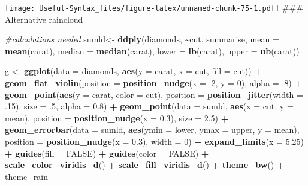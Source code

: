 \documentclass[
]{article}
\newenvironment{Shaded}{\begin{snugshade}}{\end{snugshade}}
\newcommand{\AttributeTok}[1]{\textcolor[rgb]{0.13,0.29,0.53}{#1}}
\newcommand{\CommentTok}[1]{\textcolor[rgb]{0.56,0.35,0.01}{\textit{#1}}}
\newcommand{\ConstantTok}[1]{\textcolor[rgb]{0.56,0.35,0.01}{#1}}
\newcommand{\DecValTok}[1]{\textcolor[rgb]{0.00,0.00,0.81}{#1}}
\newcommand{\FloatTok}[1]{\textcolor[rgb]{0.00,0.00,0.81}{#1}}
\newcommand{\FunctionTok}[1]{\textcolor[rgb]{0.13,0.29,0.53}{\textbf{#1}}}
\newcommand{\NormalTok}[1]{#1}
\newcommand{\OtherTok}[1]{\textcolor[rgb]{0.56,0.35,0.01}{#1}}
\newcommand{\SpecialCharTok}[1]{\textcolor[rgb]{0.81,0.36,0.00}{\textbf{#1}}}
\begin{document}
\texttt{[image: Useful-Syntax\_files/figure-latex/unnamed-chunk-75-1.pdf]}
\#\#\# Alternative raincloud

\begin{Shaded}
\begin{Highlighting}[]
\CommentTok{\#calculations needed}
\NormalTok{sumld}\OtherTok{\textless{}{-}} \FunctionTok{ddply}\NormalTok{(diamonds, }\SpecialCharTok{\textasciitilde{}}\NormalTok{cut, summarise, }\AttributeTok{mean =} \FunctionTok{mean}\NormalTok{(carat), }\AttributeTok{median =} \FunctionTok{median}\NormalTok{(carat), }\AttributeTok{lower =} \FunctionTok{lb}\NormalTok{(carat), }\AttributeTok{upper =} \FunctionTok{ub}\NormalTok{(carat))}

\NormalTok{g }\OtherTok{\textless{}{-}} \FunctionTok{ggplot}\NormalTok{(}\AttributeTok{data =}\NormalTok{ diamonds, }\FunctionTok{aes}\NormalTok{(}\AttributeTok{y =}\NormalTok{ carat, }\AttributeTok{x =}\NormalTok{ cut, }\AttributeTok{fill =}\NormalTok{ cut)) }\SpecialCharTok{+}
\FunctionTok{geom\_flat\_violin}\NormalTok{(}\AttributeTok{position =} \FunctionTok{position\_nudge}\NormalTok{(}\AttributeTok{x =}\NormalTok{ .}\DecValTok{2}\NormalTok{, }\AttributeTok{y =} \DecValTok{0}\NormalTok{), }\AttributeTok{alpha =}\NormalTok{ .}\DecValTok{8}\NormalTok{) }\SpecialCharTok{+}
\FunctionTok{geom\_point}\NormalTok{(}\FunctionTok{aes}\NormalTok{(}\AttributeTok{y =}\NormalTok{ carat, }\AttributeTok{color =}\NormalTok{ cut), }\AttributeTok{position =} \FunctionTok{position\_jitter}\NormalTok{(}\AttributeTok{width =}\NormalTok{ .}\DecValTok{15}\NormalTok{), }\AttributeTok{size =}\NormalTok{ .}\DecValTok{5}\NormalTok{, }\AttributeTok{alpha =} \FloatTok{0.8}\NormalTok{) }\SpecialCharTok{+}
\FunctionTok{geom\_point}\NormalTok{(}\AttributeTok{data =}\NormalTok{ sumld, }\FunctionTok{aes}\NormalTok{(}\AttributeTok{x =}\NormalTok{ cut, }\AttributeTok{y =}\NormalTok{ mean), }\AttributeTok{position =} \FunctionTok{position\_nudge}\NormalTok{(}\AttributeTok{x =} \FloatTok{0.3}\NormalTok{), }\AttributeTok{size =} \FloatTok{2.5}\NormalTok{) }\SpecialCharTok{+}
\FunctionTok{geom\_errorbar}\NormalTok{(}\AttributeTok{data =}\NormalTok{ sumld, }\FunctionTok{aes}\NormalTok{(}\AttributeTok{ymin =}\NormalTok{ lower, }\AttributeTok{ymax =}\NormalTok{ upper, }\AttributeTok{y =}\NormalTok{ mean), }\AttributeTok{position =} \FunctionTok{position\_nudge}\NormalTok{(}\AttributeTok{x =} \FloatTok{0.3}\NormalTok{), }\AttributeTok{width =} \DecValTok{0}\NormalTok{) }\SpecialCharTok{+}
\FunctionTok{expand\_limits}\NormalTok{(}\AttributeTok{x =} \FloatTok{5.25}\NormalTok{) }\SpecialCharTok{+}
\FunctionTok{guides}\NormalTok{(}\AttributeTok{fill =} \ConstantTok{FALSE}\NormalTok{) }\SpecialCharTok{+}
\FunctionTok{guides}\NormalTok{(}\AttributeTok{color =} \ConstantTok{FALSE}\NormalTok{) }\SpecialCharTok{+}
\FunctionTok{scale\_color\_viridis\_d}\NormalTok{() }\SpecialCharTok{+}
\FunctionTok{scale\_fill\_viridis\_d}\NormalTok{() }\SpecialCharTok{+}
\FunctionTok{theme\_bw}\NormalTok{() }\SpecialCharTok{+}
\NormalTok{theme\_rain}
\end{Highlighting}
\end{Shaded}
\end{document}
